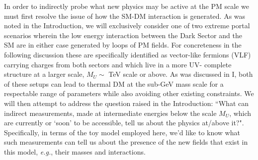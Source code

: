 \documentclass[14pt]{article}
\def\eg{{\it e.g.}}
\begin{document}
In order to indirectly probe what new physics may be active at the PM scale we must first resolve the issue of how the SM-DM interaction is generated.  As was noted in the Introduction, 
we will exclusively consider one of two extreme portal scenarios wherein the low energy interaction between the Dark Sector and the SM are in either case generated by loops of PM fields.  
For concreteness in the following discussion these are specifically identified as vector-like fermions (VLF) carrying charges from both sectors and which live in a more UV- complete structure at a 
larger scale, $M_U \sim$ TeV scale or above. As was discussed in I, both of these setups can lead to thermal DM at the sub-GeV mass scale for a respectable range of parameters while also avoiding 
other existing constraints. We will then attempt to address the question raised in the Introduction: ``What can indirect measurements, made at intermediate energies below the scale 
$M_U$, which are currently or `soon' to be accessible, tell us about the physics at/above it?".  Specifically, in terms of the toy model employed here, we'd like to know what such measurements can 
tell us about the presence of the new fields that exist in this model, \eg, their masses and interactions.
\end{document}
